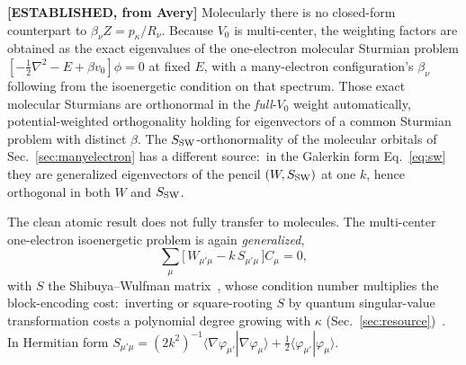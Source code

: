 \documentclass[aps,pra,twocolumn,superscriptaddress,longbibliography]{revtex4-2}
\begin{document}
\textbf{[ESTABLISHED, from Avery]} Molecularly there is no closed-form
counterpart to $\beta_\nu Z=p_\kappa/R_\nu$.  Because $V_0$ is multi-center, the
weighting factors are obtained as the exact eigenvalues of the one-electron
molecular Sturmian problem $[-\tfrac12\nabla^{2}-E+\beta v_0]\phi=0$ at fixed
$E$, with a many-electron configuration's $\beta_\nu$ following from the
isoenergetic condition on that spectrum.  Those exact molecular Sturmians are
orthonormal in the \emph{full}-$V_0$ weight automatically, potential-weighted
orthogonality holding for eigenvectors of a common Sturmian problem with distinct
$\beta$.  The $S_{\rm SW}$-orthonormality of the molecular orbitals of
Sec.~\ref{sec:manyelectron} has a different source:\ in the Galerkin form
Eq.~\eqref{eq:sw} they are generalized eigenvectors of the pencil
$(W,S_{\rm SW})$ at one $k$, hence orthogonal in both $W$ and $S_{\rm SW}$.

The clean atomic result does not fully transfer to molecules.  The multi-center
one-electron isoenergetic problem is again \emph{generalized},
\begin{equation}
\sum_\mu\big[\,W_{\mu'\mu}-k\,S_{\mu'\mu}\,\big]C_\mu=0,
\label{eq:sw}
\end{equation}
with $S$ the Shibuya--Wulfman matrix~\cite{averyphd}, whose condition number
multiplies the block-encoding cost:\ inverting or square-rooting $S$ by quantum
singular-value transformation costs a polynomial degree growing with $\kappa$
(Sec.~\ref{sec:resource})~\cite{gslw2019,cks2017}.  In Hermitian form
$S_{\mu'\mu}=(2k^2)^{-1}\langle\nabla\varphi_{\mu'}|\nabla\varphi_\mu\rangle
+\tfrac12\langle\varphi_{\mu'}|\varphi_\mu\rangle$.
\end{document}
